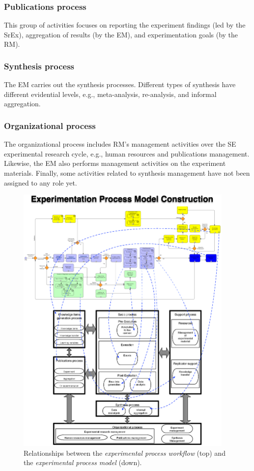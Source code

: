 \subsubsection{Publications process}
This group of activities focuses on reporting the experiment findings (led by the SrEx), aggregation of results (by the EM), and experimentation goals (by the RM).

\subsubsection{Synthesis process}
The EM carries out the synthesis processes. Different types of synthesis have different evidential levels, e.g., meta-analysis, re-analysis, and informal aggregation.

\subsubsection{Organizational process}
The organizational process includes RM's management activities over the SE experimental research cycle, e.g., human resources and publications management. Likewise, the EM also performs management activities on the experiment materials. Finally, some activities related to synthesis management have not been assigned to any role yet.

\begin{figure}[htbp]
\begin{center}
\includegraphics[trim=0 0 0 48,clip,width=0.95\textwidth]{images/Experimentation-Process-Model-Construction}
\caption{Relationships between the \textit{experimental process workflow} (top) and the \textit{experimental process model} (down).}
\label{fig-EPM-construction}
\end{center}
\end{figure}

